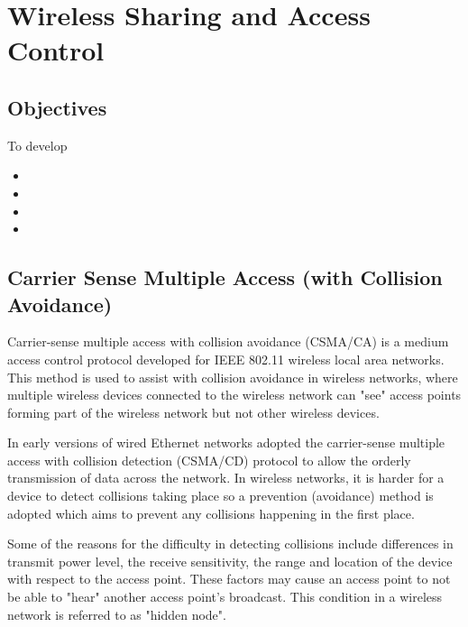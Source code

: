 \chapter{Wireless Sharing and Access Control}\label{waccess}

\minitoc 

\clearpage
\section*{Objectives}
To develop 
\begin{itemize}

\item 

\item 

\item 

\item 

\end{itemize}

\section{Carrier Sense Multiple Access (with Collision Avoidance)}

Carrier-sense multiple access with collision avoidance (CSMA/CA) is a medium access control protocol developed for IEEE 802.11 wireless local area networks.  This method is used to assist with collision avoidance in wireless networks, where multiple wireless devices connected to the wireless network can "see" access points forming part of the wireless network but not other wireless devices. 

In early versions of wired Ethernet networks adopted the carrier-sense multiple access with collision detection (CSMA/CD) protocol to allow the orderly transmission of data across the network. In wireless networks, it is harder for a device to detect collisions taking place so a prevention (avoidance) method is adopted which aims to prevent any collisions happening in the first place.  

Some of the reasons for the difficulty in detecting collisions include differences in transmit power level, the receive sensitivity, the range and location of the device with respect to the access point. These factors may cause an access point to not be able to "hear" another access point's broadcast. This condition in a wireless network is referred to as "hidden node".

